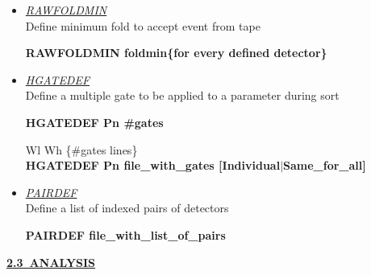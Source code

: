 \begin{itemize}

 \item 	{\it\underline{RAWFOLDMIN}} \\
	{\sc Define minimum fold to accept event from tape}

	\smallskip
	{\bf RAWFOLDMIN foldmin\{for every defined detector\}} \\

 \item	{\it\underline{HGATEDEF}} \\
	{\sc Define a multiple gate to be applied to a parameter during sort}

	\smallskip
	{\bf HGATEDEF Pn \#gates} 

	\hskip1cm Wl Wh \{\#gates lines\} \\

  	{\bf HGATEDEF Pn file\_with\_gates [Individual$|$Same\_for\_all]} \\

 \item	{\it\underline{PAIRDEF}} \\
	{\sc Define a list of indexed pairs of detectors}

	\smallskip
	{\bf PAIRDEF file\_with\_list\_of\_pairs} 
	
\end{itemize}

\newpage
{\large\underline{\bf 2.3~ANALYSIS}} \\

